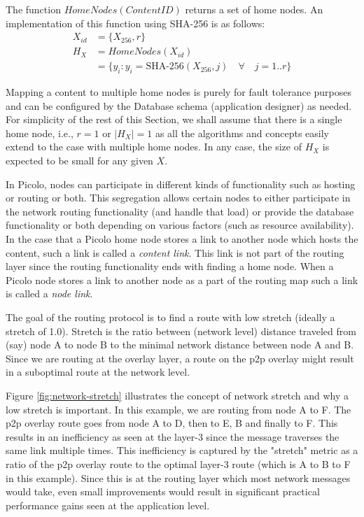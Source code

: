 The function \(HomeNodes(ContentID)\) returns a set of home nodes. An implementation of this function using SHA-256 is as follows:
\begin{align}
    X_{id} &= \{X_{256}, r\} \\
    H_X &= HomeNodes(X_{id}) \\
        &= \{ y_i : y_i = \textrm{SHA-256}(X_{256}, j) \quad \forall \quad j = 1 .. r\}
\end{align}

Mapping a content to multiple home nodes is purely for fault tolerance purposes and can be configured by the Database
schema (application designer) as needed. For simplicity of the rest of this Section, we shall assume that there is a
single home node, i.e., \( r = 1\) or \( |H_X| = 1\) as all the algorithms and concepts easily extend to the case with
multiple home nodes.  In any case, the size of \( H_X \) is expected to be small for any given \(X\).

In Picolo, nodes can participate in different kinds of functionality such as hosting or routing or both. This
segregation allows certain nodes to either participate in the network routing functionality (and handle that load) or
provide the database functionality or both depending on various factors (such as resource availability). In the case
that a Picolo home node stores a link to another node which hosts the content, such a link is called a {\em content
link}. This link is not part of the routing layer since the routing functionality ends with finding a home node. When a
Picolo node stores a link to another node as a part of the routing map such a link is called a {\em node link}.

The goal of the routing protocol is to find a route with low stretch (ideally a stretch of 1.0). Stretch is the ratio
between (network level) distance traveled from (say) node A to node B to the minimal network distance between node A and B.
Since we are routing at the overlay layer, a route on the p2p overlay might result in a suboptimal route at the network
level.

Figure \ref{fig:network-stretch} illustrates the concept of network stretch and why a low stretch is important. In this
example, we are routing from node A to F. The p2p overlay route goes from node A to D, then to E, B and finally to F.
This results in an inefficiency as seen at the layer-3 since the message traverses the same link multiple times. This
inefficiency is captured by the "stretch" metric as a ratio of the p2p overlay route to the optimal layer-3 route (which
is A to B to F in this example). Since this is at the routing layer which most network messages would take, even small
improvements would result in significant practical performance gains seen at the application level.

